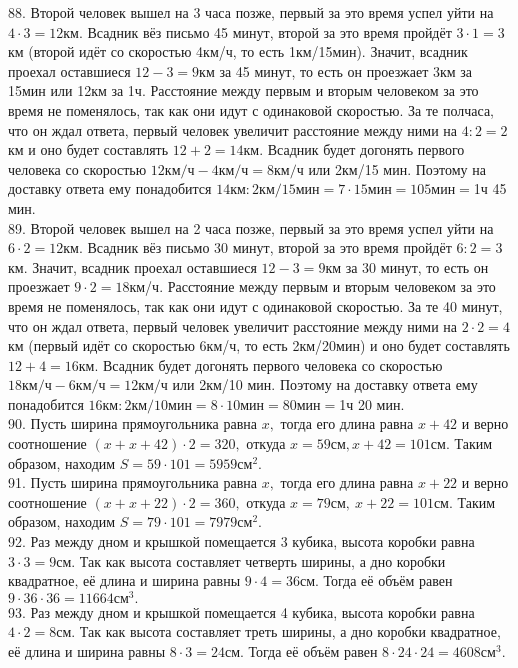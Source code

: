88. Второй человек вышел на 3 часа позже, первый за это время успел уйти на $4\cdot3=12$км. Всадник вёз письмо 45 минут, второй за это время пройдёт $3\cdot1=3$км (второй идёт со скоростью 4км/ч, то есть 1км/15мин). Значит, всадник проехал оставшиеся $12-3=9$км за 45 минут, то есть он проезжает 3км за 15мин или 12км за 1ч. Расстояние между первым и вторым человеком за это время не поменялось, так как они идут с одинаковой скоростью. За те полчаса, что он ждал ответа, первый человек увеличит расстояние между ними на $4:2=2$км и оно будет составлять $12+2=14$км. Всадник будет догонять первого человека со скоростью $12\text{км/ч}-4\text{км/ч}=8\text{км/ч}$ или 2км/15 мин. Поэтому на доставку ответа ему понадобится $14\text{км}:2\text{км/15мин}=7\cdot15\text{мин}=105\text{мин}=$1ч 45 мин.\\
89. Второй человек вышел на 2 часа позже, первый за это время успел уйти на $6\cdot2=12$км. Всадник вёз письмо 30 минут, второй за это время пройдёт $6:2=3$км. Значит, всадник проехал оставшиеся $12-3=9$км за 30 минут, то есть он проезжает $9\cdot2=18$км/ч. Расстояние между первым и вторым человеком за это время не поменялось, так как они идут с одинаковой скоростью. За те 40 минут, что он ждал ответа, первый человек увеличит расстояние между ними на $2\cdot2=4$км (первый идёт со скоростью 6км/ч, то есть 2км/20мин) и оно будет составлять $12+4=16$км. Всадник будет догонять первого человека со скоростью $18\text{км/ч}-6\text{км/ч}=12\text{км/ч}$ или 2км/10 мин. Поэтому на доставку ответа ему понадобится $16\text{км}:2\text{км/10мин}=8\cdot10\text{мин}=80\text{мин}=$1ч 20 мин.\\
90. Пусть ширина прямоугольника равна $x,$ тогда его длина равна $x+42$ и верно соотношение $(x+x+42)\cdot2=320,$ откуда $x=59\text{см}, x+42=101\text{см}.$ Таким образом, находим
$S=59\cdot101=5959\text{см}^2.$\\
91. Пусть ширина прямоугольника равна $x,$ тогда его длина равна $x+22$ и верно соотношение $(x+x+22)\cdot2=360,$ откуда $x=79\text{см},\ x+22=101\text{см}.$ Таким образом, находим
$S=79\cdot101=7979\text{см}^2.$\\
92. Раз между дном и крышкой помещается 3 кубика, высота коробки равна $3\cdot3=9$см. Так как высота составляет четверть ширины, а дно коробки квадратное, её длина и ширина равны $9\cdot4=36$см. Тогда её объём равен $9\cdot36\cdot36=11664\text{см}^3.$\\
93. Раз между дном и крышкой помещается 4 кубика, высота коробки равна $4\cdot2=8$см. Так как высота составляет треть ширины, а дно коробки квадратное, её длина и ширина равны $8\cdot3=24$см. Тогда её объём равен $8\cdot24\cdot24=4608\text{см}^3.$\\
